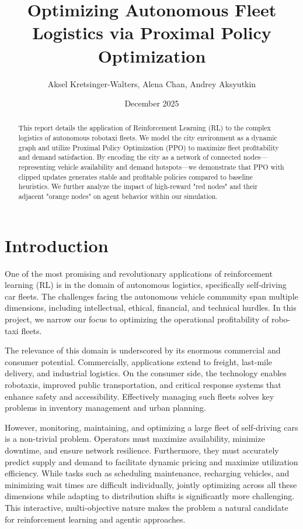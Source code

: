 \documentclass[11pt]{article}
\title{\textbf{Optimizing Autonomous Fleet Logistics via Proximal Policy Optimization}}
\author{Aksel Kretsinger-Walters, Alena Chan, Andrey Aksyutkin}
\date{December 2025}
\begin{document}
\maketitle

\begin{abstract}
		This report details the application of Reinforcement Learning (RL) to the complex logistics of autonomous
		robotaxi fleets. We model the city environment as a dynamic graph and utilize Proximal Policy Optimization
		(PPO) to maximize fleet profitability and demand satisfaction. By encoding the city as a network of
		connected nodes—representing vehicle availability and demand hotspots—we demonstrate that PPO with clipped
		updates generates stable and profitable policies compared to baseline heuristics. We further analyze the
		impact of high-reward "red nodes" and their adjacent "orange nodes" on agent behavior within our simulation.
\end{abstract}

\section{Introduction}

One of the most promising and revolutionary applications of reinforcement learning (RL) is in the domain of
autonomous logistics, specifically self-driving car fleets. The challenges facing the autonomous vehicle
community span multiple dimensions, including intellectual, ethical, financial, and technical hurdles. In
this project, we narrow our focus to optimizing the operational profitability of robo-taxi fleets.

The relevance of this domain is underscored by its enormous commercial and consumer potential. Commercially,
applications extend to freight, last-mile delivery, and industrial logistics. On the consumer side, the
technology enables robotaxis, improved public transportation, and critical response systems that enhance
safety and accessibility. Effectively managing such fleets solves key problems in inventory management and
urban planning.

However, monitoring, maintaining, and optimizing a large fleet of self-driving cars is a non-trivial problem.
Operators must maximize availability, minimize downtime, and ensure network resilience. Furthermore, they
must accurately predict supply and demand to facilitate dynamic pricing and maximize utilization efficiency.
While tasks such as scheduling maintenance, recharging vehicles, and minimizing wait times are difficult
individually, jointly optimizing across all these dimensions while adapting to distribution shifts is
significantly more challenging. This interactive, multi-objective nature makes the problem a natural
candidate for reinforcement learning and agentic approaches.
\end{document}
